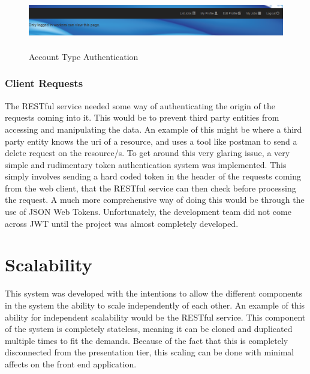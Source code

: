 \begin{figure}[H]
    \centering
    \includegraphics[width=\textwidth, height=70pt]{img/auth.PNG}
    \caption{Account Type Authentication}
    \label{fig:accountAuth}
\end{figure}

\bigskip

\subsubsection{Client Requests}
\label{sec:SystemEvaluationClientRequests}
The RESTful service needed some way of authenticating the origin of the requests coming into it. This would be to prevent third party entities from accessing and manipulating the data. An example of this might be where a third party entity knows the uri of a resource, and uses a tool like postman to send a delete request on the resource/s. To get around this very glaring issue, a very simple and rudimentary token authentication system was implemented. This simply involves sending a hard coded token in the header of the requests coming from the web client, that the RESTful service can then check before processing the request. A much more comprehensive way of doing this would be through the use of JSON Web Tokens\cite{jones2015json}. Unfortunately, the development team did not come across JWT until the project was almost completely developed.  



\section{Scalability}
\label{sec:SystemEvaluationScalability}
This system was developed with the intentions to allow the different components in the system the ability to scale independently of each other. An example of this ability for independent scalability would be the RESTful service. This component of the system is completely stateless, meaning it can be cloned and duplicated multiple times to fit the demands. Because of the fact that this is completely disconnected from the presentation tier, this scaling can be done with minimal affects on the front end application. 


